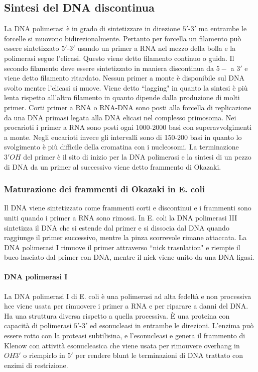 \subsection{Sintesi del DNA discontinua}
La DNA polimerasi \`e in grado di sintetizzare in direzione $5'$-$3'$ ma entrambe le forcelle si muovono bidirezionalmente. Pertanto per forcella un filamento pu\`o essere sintetizzato
$5'$-$3'$ usando un primer a RNA nel mezzo della bolla e la polimerasi segue l'elicasi. Questo viene detto filamento continuo o guida. Il secondo filamento deve essere sintetizzato in 
maniera discontinua da $5-$ a $3'$ e viene detto filamento ritardato. Nessun primer a monte \`e disponibile sul DNA svolto mentre l'elicasi si muove. Viene detto ``lagging" in 
quanto la sintesi \`e pi\`u lenta rispetto all'altro filamento in quanto dipende dalla produzione di molti primer. Corti primer a RNA o RNA-DNA sono posti alla forcella di replicazione
da una DNA primasi legata alla DNA elicasi nel complesso primosoma. Nei procarioti i primer a RNA sono posti ogni \num{1000}-\num{2000} basi con superavvolgimenti a monte. Negli 
eucarioti invece gli intervalli sono di \num{150}-\num{200} basi in quanto lo svolgimento \`e pi\`u difficile della cromatina con i nucleosomi. La terminazione $3'OH$ del primer
\`e il sito di inizio per la DNA polimerasi e la sintesi di un pezzo di DNA da un primer al successivo viene detto frammento di Okazaki. 
\subsubsection{Maturazione dei frammenti di Okazaki in E. coli}
Il DNA viene sintetizzato come frammenti corti e discontinui e i frammenti sono uniti quando i primer a RNA sono rimossi. In E. coli la DNA polimerasi III sintetizza il DNA che si 
estende dal primer e si dissocia dal DNA quando raggiunge il primer successivo, mentre la pinza scorrevole rimane attaccata. La DNA polimerasi I rimuove il primer attraverso 
``nick trasnlation" e riempie il buco lasciato dal primer con DNA, mentre il nick viene unito da una DNA ligasi. 
\paragraph{DNA polimerasi I}
La DNA polimerasi I di E. coli \`e una polimerasi ad alta fedelt\`a e non processiva hce viene usata per rimuovere i primer a RNA e per riparare a danni del DNA. Ha una struttura diversa 
rispetto a quella processiva. \`E una proteina con capacit\`a di polimerasi $5'$-$3'$ ed esonucleasi in entrambe le direzioni. L'enzima pu\`o essere rotto con la proteasi subtilisina, 
e l'esonucleasi e genera il frammento di Klenow con attivit\`a esonucleasica che viene usata per rimouvere overhang in $OH3'$ o riempirlo in $5'$ per rendere blunt le terminazioni di 
DNA trattato con enzimi di restrizione. 
